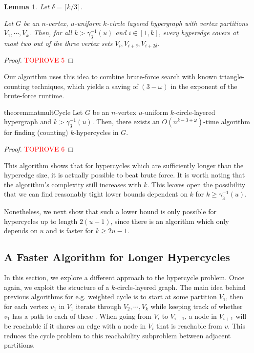 \documentclass[11pt,letterpaper,pdftex]{article}
\newtheorem{lemma}[theorem]{Lemma}
\begin{document}
\begin{lemma} \label{lem: triangle partitions}
    Let $\delta = \lceil k/3 \rceil$.

    Let $G$ be an $n$-vertex, $u$-uniform $k$-circle layered hypergraph with vertex partitions $V_1, \cdots, V_k$.
    Then, for all $k>\gamma_3^{-1}(u)$ and $i \in [1,k]$, every hyperedge covers at most two out of the three vertex sets $V_i,V_{i+\delta},V_{i+2\delta}$.
\end{lemma}
\begin{proof}\textcolor{red}{TOPROVE 5}\end{proof}

Our algorithm uses this idea to combine brute-force search with known triangle-counting techniques, which yields a saving of $(3-\omega)$ in the exponent of the brute-force runtime.


\begin{restatable}{theorem}{matmultCycle} \label{thm: matmul_cycle}
    Let $G$ be an $n$-vertex $u$-uniform $k$-circle-layered hypergraph and $k > \gamma^{-1}_3(u)$.
    Then, there exists an $O(n^{k-3+\omega})$-time algorithm for finding (counting) $k$-hypercycles in $G$.
\end{restatable}


\begin{proof}\textcolor{red}{TOPROVE 6}\end{proof}
This algorithm shows that for hypercycles which are sufficiently longer than the hyperedge size, it is actually possible to beat brute force.
It is worth noting that the algorithm's complexity still increases with $k$.
This leaves open the possibility that we can find reasonably tight lower bounds dependent on $k$ for $k \geq \gamma^{-1}_3(u)$.

Nonetheless, we next show that such a lower bound is only possible for hypercycles up to length $2(u-1)$, since there is an algorithm which only depends on $u$ and is faster for $k \geq 2u-1$.

\subsection{A Faster Algorithm for Longer Hypercycles} \label{subsec:longer_hypercycles}

In this section, we explore a different approach to the hypercycle problem.
Once again, we exploit the structure of a $k$-circle-layered graph.
The main idea behind previous algorithms for e.g. weighted cycle is to start at some partition $V_1$, then for each vertex $v_1$ in $V_1$ iterate through $V_2,\cdots,V_k$ while keeping track of whether $v_1$ has a path to each of these \cite{LVW18}.
When going from $V_i$ to $V_{i+1}$, a node in $V_{i+1}$ will be reachable if it shares an edge with a node in $V_i$ that is reachable from $v$.
This reduces the cycle problem to this reachability subproblem between adjacent partitions.
\end{document}
